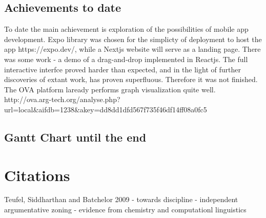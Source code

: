 \documentclass{article}
\begin{document}
\subsection{Achievements to date}
To date the main achievement is exploration of the possibilities of mobile app development. 
Expo library was chosen for the simplicty of deployment to host the app https://expo.dev/, while a Nextjs website will serve as a landing page.
There was some work - a demo of a drag-and-drop implemented in Reactjs. The full interactive interfce proved harder than expected, and in the light of further discoveries of extant work, has proven superfluous.
Therefore it was not finished.
The OVA platform laready performs graph visualization quite well.
http://ova.arg-tech.org/analyse.php?url=local&aifdb=1238&akey=dd8dd1dfd567f735f46df14ff08a0fc5

\subsection{Gantt Chart until the end}

\section{Citations}


Teufel, Siddharthan and Batchelor  2009 - towards discipline - independent argumentative zoning - evidence from chemistry and computationl linguistics
\newpage
\end{document}
